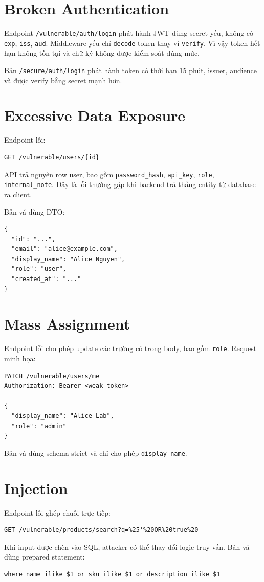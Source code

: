 \documentclass[12pt,a4paper]{report}
\begin{document}
\section{Broken Authentication}
Endpoint \texttt{/vulnerable/auth/login} phát hành JWT dùng secret yếu, không có \texttt{exp}, \texttt{iss}, \texttt{aud}. Middleware yếu chỉ \texttt{decode} token thay vì \texttt{verify}. Vì vậy token hết hạn không tồn tại và chữ ký không được kiểm soát đúng mức.

Bản \texttt{/secure/auth/login} phát hành token có thời hạn 15 phút, issuer, audience và được verify bằng secret mạnh hơn.

\section{Excessive Data Exposure}
Endpoint lỗi:
\begin{lstlisting}
GET /vulnerable/users/{id}
\end{lstlisting}
API trả nguyên row user, bao gồm \texttt{password\_hash}, \texttt{api\_key}, \texttt{role}, \texttt{internal\_note}. Đây là lỗi thường gặp khi backend trả thẳng entity từ database ra client.

Bản vá dùng DTO:
\begin{lstlisting}
{
  "id": "...",
  "email": "alice@example.com",
  "display_name": "Alice Nguyen",
  "role": "user",
  "created_at": "..."
}
\end{lstlisting}

\section{Mass Assignment}
Endpoint lỗi cho phép update các trường có trong body, bao gồm \texttt{role}. Request minh họa:
\begin{lstlisting}
PATCH /vulnerable/users/me
Authorization: Bearer <weak-token>

{
  "display_name": "Alice Lab",
  "role": "admin"
}
\end{lstlisting}
Bản vá dùng schema strict và chỉ cho phép \texttt{display\_name}.

\section{Injection}
Endpoint lỗi ghép chuỗi trực tiếp:
\begin{lstlisting}
GET /vulnerable/products/search?q=%25'%20OR%20true%20--
\end{lstlisting}
Khi input được chèn vào SQL, attacker có thể thay đổi logic truy vấn. Bản vá dùng prepared statement:
\begin{lstlisting}
where name ilike $1 or sku ilike $1 or description ilike $1
\end{lstlisting}
\end{document}
